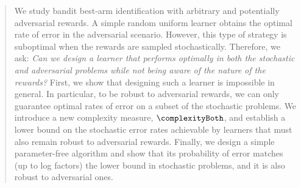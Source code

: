 %
\begin{abstract}%
%
We study bandit best-arm identification 
 with arbitrary and potentially adversarial rewards. 
    A simple random uniform
   learner obtains the optimal rate of error in the 
    adversarial scenario. However, this 
    type of strategy is suboptimal when the rewards are sampled 
    stochastically. Therefore, we ask:
    \emph{Can we design a learner that
   performs optimally in both the stochastic  
   and adversarial problems while not being aware of the nature of the rewards?}
        First, we show that designing such a learner is impossible in general. 
        In particular, to be robust to adversarial rewards, we can 
        only guarantee optimal rates of
         error on a subset of the stochastic problems. We introduce a new complexity measure, $\complexityBoth$,
         and establish a lower bound on the stochastic error
         rates achievable by learners that must also remain
         robust to adversarial rewards. 
Finally, we design a simple parameter-free algorithm and show that its 
probability of error matches (up to log factors) the lower bound in 
stochastic problems, and it is also robust to adversarial ones.
%
\end{abstract}%